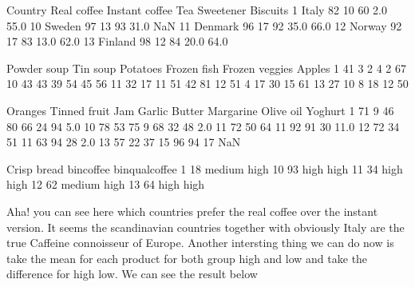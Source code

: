 \documentclass[letterpaper,10pt,english]{jupyterBook}
\begin{document}
\begin{sphinxVerbatim}[commandchars=\\\{\}]
    Country  Real coffee  Instant coffee  Tea  Sweetener  Biscuits  \PYGZbs{}
1     Italy           82              10   60        2.0      55.0   
10   Sweden           97              13   93       31.0       NaN   
11  Denmark           96              17   92       35.0      66.0   
12   Norway           92              17   83       13.0      62.0   
13  Finland           98              12   84       20.0      64.0   

    Powder soup  Tin soup  Potatoes  Frozen fish  Frozen veggies  Apples  \PYGZbs{}
1            41         3         2            4               2      67   
10           43        43        39           54              45      56   
11           32        17        11           51              42      81   
12           51         4        17           30              15      61   
13           27        10         8           18              12      50   

    Oranges  Tinned fruit  Jam  Garlic  Butter  Margarine  Olive oil  Yoghurt  \PYGZbs{}
1        71             9   46      80      66         24         94      5.0   
10       78            53   75       9      68         32         48      2.0   
11       72            50   64      11      92         91         30     11.0   
12       72            34   51      11      63         94         28      2.0   
13       57            22   37      15      96         94         17      NaN   

    Crisp bread bin\PYGZus{}coffee bin\PYGZus{}qual\PYGZus{}coffee  
1            18     medium            high  
10           93       high            high  
11           34       high            high  
12           62     medium            high  
13           64       high            high  
\end{sphinxVerbatim}

\sphinxAtStartPar
Aha! you can see here which countries prefer the real coffee over the instant version.
It seems the scandinavian countries together with obviously Italy are the true Caffeine connoisseur of Europe.
Another intersting thing we can do now is take the mean for each product for both group high and low and take the difference for high \sphinxhyphen{} low.
We can see the result below

\begin{sphinxVerbatim}[commandchars=\\\{\}]
\PYG{p}{[}\PYG{p}{]}\PYG{p}{[}\PYG{p}{]}
\end{sphinxVerbatim}
\end{document}
